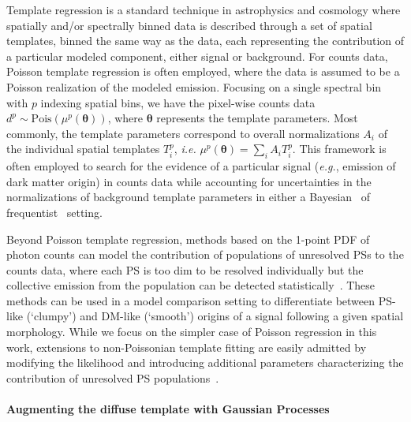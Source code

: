 \documentclass[]{article}
\begin{document}
Template regression is a standard technique in astrophysics and cosmology where spatially and/or spectrally binned data is described through a set of spatial templates, binned the same way as the data, each representing the contribution of a particular modeled component, either signal or background. For counts data, Poisson template regression is often employed, where the data is assumed to be a Poisson realization of the modeled emission. Focusing on a single spectral bin with $p$ indexing spatial bins, we have the pixel-wise counts data $d^{p}\sim\mathrm{Pois}\left(\mu^{p}(\boldsymbol{\theta})\right)$, where $\boldsymbol{\theta}$ represents the template parameters. Most commonly, the template parameters correspond to overall normalizations $A_i$ of the individual spatial templates $T_{i}^{p}$,  \emph{i.e.} $\mu^{p}(\boldsymbol{\theta}) = \sum_{i}A_i T_{i}^{p}$. This framework is often employed to search for the evidence of a particular signal (\emph{e.g.}, emission of dark matter origin) in counts data while accounting for uncertainties in the  normalizations of background template parameters in either a Bayesian~\cite{Hoof:2018hyn} of frequentist~\cite{Lisanti:2017qoz} setting. 

Beyond Poisson template regression, methods based on the 1-point PDF of photon counts can model the contribution of populations of unresolved PSs to the counts data, where each PS is too dim to be resolved individually but the collective emission from the population can be detected statistically~\cite{Malyshev:2011zi,Lee:2014mza}. These methods can be used in a model comparison setting to differentiate between PS-like (`clumpy') and DM-like (`smooth') origins of a signal following a given spatial morphology. While we focus on the simpler case of Poisson regression in this work, extensions to non-Poissonian template fitting are easily admitted by modifying the likelihood and introducing additional parameters characterizing the contribution of unresolved PS populations~\cite{Mishra-Sharma:2016gis}. 

\paragraph{Augmenting the diffuse template with Gaussian Processes} 
\end{document}
